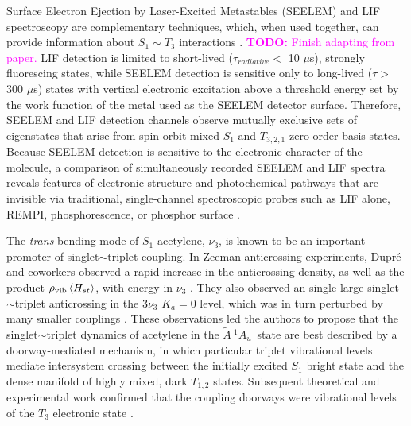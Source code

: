 \documentclass[12pt]{mitthesis}
\newcommand{\TODO} [1]{\textcolor{magenta}{\textbf{TODO:} #1}}
\newcommand{\rcm}{cm$^{-1}$}
\newcommand{\astate}{$
  \tilde{A} \: ^1\!A_u
  $}
\newcommand{\StoS}{$
  S_1 \leftarrow S_0
  $}
\newcommand{\microsec}{$\mu$s}
\begin{document}
Surface Electron Ejection by Laser-Excited Metastables \cite{sneh89a,
  sneh89b, sneh91, humphrey97} (SEELEM) and LIF spectroscopy are
complementary techniques, which, when used together, can provide
information about $S_1 \sim T_3$ interactions \cite{humphrey97,
  mishra04, altunata00, altunata02}.  \TODO{Finish adapting from
  paper.}  LIF detection is limited to short-lived
($\tau_{radiative}<$ 10 \microsec), strongly fluorescing states, while
SEELEM detection is sensitive only to long-lived ($\tau >$ 300
\microsec) states with vertical electronic excitation above a
threshold energy set by the work function of the metal used as the
SEELEM detector surface.  Therefore, SEELEM and LIF detection channels
observe mutually exclusive sets of eigenstates that arise from
spin-orbit mixed $S_1$ and $T_{3,2,1}$ zero-order basis states.
Because SEELEM detection is sensitive to the electronic character of
the molecule, a comparison of simultaneously recorded SEELEM and LIF
spectra reveals features of electronic structure and photochemical
pathways that are invisible via traditional, single-channel
spectroscopic probes such as LIF alone, REMPI, phosphorescence, or
phosphor surface \cite{shi98, campos01, burton72}.
 

The \emph{trans}-bending mode of $S_1$ acetylene, $\nu_3$, is known to
be an important promoter of singlet$\sim$triplet coupling.  In Zeeman
anticrossing experiments, Dupr\'{e} and coworkers observed a rapid
increase in the anticrossing density, as well as the product
$\rho_{\text{vib}} \mathinner{\langle{H_{st}}\rangle}$, with energy in $\nu_3$
\cite{dupre91, dupre95b}.  They also observed an single large
singlet$\sim$triplet anticrossing in the $3 \nu_3$ $K_a=0$ level,
which was in turn perturbed by many smaller couplings \cite{dupre93}.
These observations led the authors to propose that the
singlet$\sim$triplet dynamics of acetylene in the \astate\ state are
best described by a doorway-mediated mechanism, in which particular
triplet vibrational levels mediate intersystem crossing between the
initially excited $S_1$ bright state and the dense manifold of highly
mixed, dark $T_{1,2}$ states.  Subsequent theoretical and experimental
work confirmed that the coupling doorways were vibrational levels of
the $T_3$ electronic state \cite{vacek96, sherrill96, humphrey97,
  altunata00}.
\end{document}

